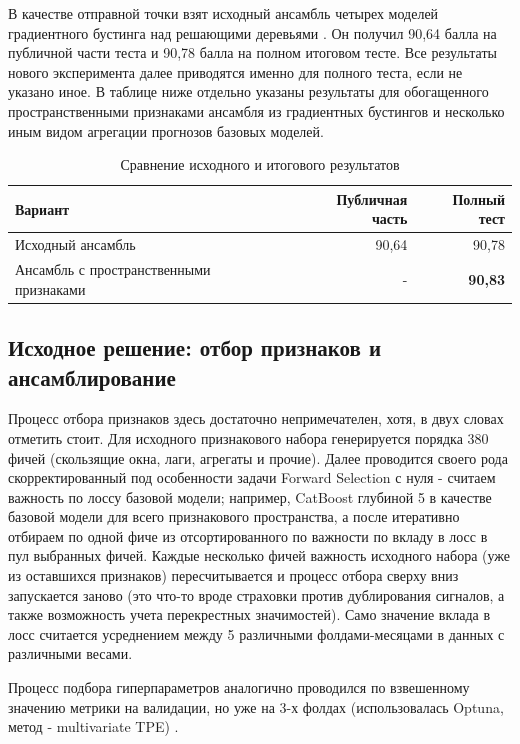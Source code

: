 \documentclass[12pt, a4paper]{article}
\newcommand{\tablesource}[1]{\par\vspace{1mm}{\footnotesize Источник: #1.}}
\begin{document}
В качестве отправной точки взят исходный ансамбль четырех моделей градиентного бустинга над решающими деревьями \cite{friedman2001}.
Он получил 90,64 балла на публичной части теста и 90,78 балла на полном итоговом тесте.
Все результаты нового эксперимента далее приводятся именно для полного теста, если не указано иное. В таблице
ниже отдельно указаны результаты для обогащенного пространственными признаками ансамбля из градиентных бустингов и несколько иным видом
агрегации прогнозов базовых моделей.

\begin{table}[H]
\centering
\footnotesize
\caption{Сравнение исходного и итогового результатов}
\begin{tabularx}{\textwidth}{Xrr}\toprule
Вариант & Публичная часть & Полный тест\\\midrule
Исходный ансамбль & 90,64 & 90,78\\
Ансамбль с пространственными признаками & - & \textbf{90,83}\\\bottomrule
\end{tabularx}
\tablesource{расчеты авторов по данным X5 Group}
\end{table}

\subsection*{Исходное решение: отбор признаков и ансамблирование}

Процесс отбора признаков здесь достаточно непримечателен, хотя, в двух словах отметить стоит.
Для исходного признакового набора генерируется порядка 380 фичей (скользящие окна, лаги, агрегаты и прочие).
Далее проводится своего рода скорректированный под особенности задачи Forward Selection с нуля - считаем важность по
лоссу базовой модели; например, CatBoost глубиной 5 в качестве базовой модели для всего признакового пространства,
а после итеративно отбираем по одной фиче из отсортированного по важности по вкладу в лосс в пул выбранных фичей.
Каждые несколько фичей важность исходного набора (уже из оставшихся признаков) пересчитывается и процесс отбора сверху вниз запускается заново
(это что-то вроде страховки против дублирования сигналов, а также возможность учета перекрестных значимостей).
Само значение вклада в лосс считается усреднением между 5 различными фолдами-месяцами в данных с различными весами.

Процесс подбора гиперпараметров аналогично проводился по взвешенному значению метрики на валидации,
но уже на 3-х фолдах (использовалась Optuna, метод - multivariate TPE) \cite{akiba2019, bergstra2011}.
\end{document}
